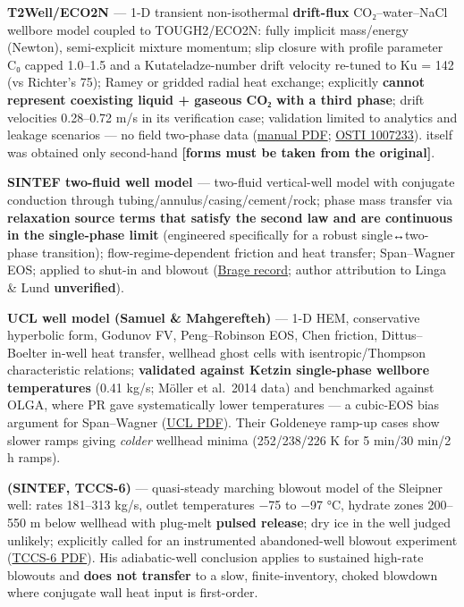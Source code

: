 \textbf{T2Well/ECO2N \citep{pan2011}} --- 1-D
transient non-isothermal \textbf{drift-flux} CO₂--water--NaCl wellbore
model coupled to TOUGH2/ECO2N: fully implicit mass/energy (Newton),
semi-explicit mixture momentum; \citet{shi2005} slip closure with
profile parameter C₀ capped 1.0--1.5 and a Kutateladze-number drift
velocity re-tuned to Ku = 142 (vs Richter's 75); Ramey or gridded radial
heat exchange; explicitly \textbf{cannot represent coexisting liquid +
gaseous CO₂ with a third phase}; drift velocities 0.28--0.72 m/s in its
verification case; validation limited to analytics and leakage scenarios
--- no field two-phase data
(\href{https://escholarship.org/content/qt0k35m2vg/qt0k35m2vg.pdf}{manual
PDF}; \href{https://www.osti.gov/biblio/1007233}{OSTI 1007233}). \citet{shi2005} itself was obtained only second-hand
\textbf{{[}forms must be taken from the original{]}}.

\textbf{SINTEF two-fluid well model \citep{linga2016}} --- two-fluid vertical-well model with
conjugate conduction through tubing/annulus/casing/cement/rock; phase
mass transfer via \textbf{relaxation source terms that satisfy the
second law and are continuous in the single-phase limit} (engineered
specifically for a robust single↔two-phase transition);
flow-regime-dependent friction and heat transfer; Span--Wagner EOS;
applied to shut-in and blowout
(\href{https://sintef.brage.unit.no/sintef-xmlui/handle/11250/2620521}{Brage
record}; author attribution to Linga \& Lund \textbf{unverified}).

\textbf{UCL well model (Samuel \& Mahgerefteh)} --- 1-D HEM,
conservative hyperbolic form, Godunov FV, Peng--Robinson EOS, Chen
friction, Dittus--Boelter in-well heat transfer, wellhead ghost cells
with isentropic/Thompson characteristic relations; \textbf{validated
against Ketzin single-phase wellbore temperatures} (0.41 kg/s; Möller et
al.~2014 data) and benchmarked against OLGA, where PR gave
systematically lower temperatures --- a cubic-EOS bias argument for
Span--Wagner
(\href{https://discovery-pp.ucl.ac.uk/10080131/3/Samuel\%20Ramp-up\%20injection\%20paper.pdf}{UCL
PDF}). Their Goldeneye ramp-up cases show slower ramps giving
\emph{colder} wellhead minima (252/238/226 K for 5 min/30 min/2 h
ramps).

\textbf{\citet{lindeberg2011} (SINTEF, TCCS-6)} --- quasi-steady marching
blowout model of the Sleipner well: rates 181--313 kg/s, outlet
temperatures −75 to −97 °C, hydrate zones 200--550 m below wellhead with
plug-melt \textbf{pulsed release}; dry ice in the well judged unlikely;
explicitly called for an instrumented abandoned-well blowout experiment
(\href{https://www.sintef.no/globalassets/project/tccs6/presentations/e6/03_co2blowout.pdf}{TCCS-6
PDF}). His adiabatic-well conclusion applies to sustained high-rate
blowouts and \textbf{does not transfer} to a slow, finite-inventory,
choked blowdown where conjugate wall heat input is first-order.

